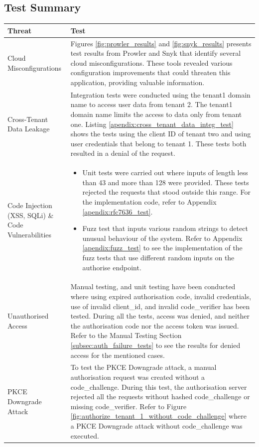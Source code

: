 \newpage
\subsection{Test Summary}
\begin{longtable}{|p{5cm}|p{10cm}|}
\hline
\rowcolor{grey!15}
\textbf{Threat} & \textbf{Test} \\
\hline
\endhead
\hline
\endfoot
Cloud Misconfigurations &  Figures \ref{fig:prowler_results} and \ref{fig:snyk_results} presents test results from Prowler and Snyk that identify several cloud misconfigurations. These tools revealed various configuration improvements that could threaten this application, providing valuable information. \\
\hline
Cross-Tenant Data Leakage & Integration tests were conducted using the tenant1 domain name to access user data from tenant 2. The tenant1 domain name limits the access to data only from tenant one. Listing \ref{apendix:cross_tenant_data_integ_test} shows the tests using the client ID of tenant two and using user credentials that belong to tenant 1. These tests both resulted in a denial of the request.\\
\hline
Code Injection (XSS, SQLi) \& Code Vulnerabilities & \begin{itemize}
    \item Unit tests were carried out where inputs of length less than 43 and more than 128 were provided. These tests rejected the requests that stood outside this range. For the implementation code, refer to Appendix \ref{apendix:rfc7636_test}.
    \item Fuzz test that inputs various random strings to detect unusual behaviour of the system. Refer to Appendix \ref{apendix:fuzz_test} to see the implementation of the fuzz tests that use different random inputs on the authorise endpoint.
\end{itemize}\\
\hline
 Unauthorised Access & Manual testing, and unit testing have been conducted where using expired authorisation code, invalid credentials, use of invalid client\_id, and invalid code\_verifier has been tested. During all the tests, access was denied, and neither the authorisation code nor the access token was issued. Refer to the Manual Testing Section \ref{subsec:auth_failure_tests} to see the results for denied access for the mentioned cases.\\
\hline
PKCE Downgrade Attack & To test the PKCE Downgrade attack, a manual authorisation request was created without a code\_challenge. During this test, the authorisation server rejected all the requests without hashed code\_challenge or missing code\_verifier. Refer to Figure \ref{fig:authorize_tenant_1_without_code_challenge} where a PKCE Downgrade attack without code\_challenge was executed.\\

\end{longtable}
